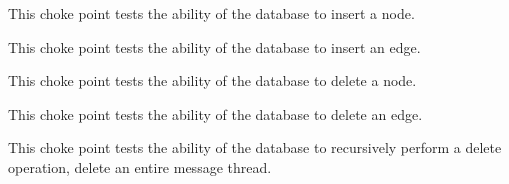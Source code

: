 
This choke point tests the ability of the database to insert a node.





This choke point tests the ability of the database to insert an edge.





This choke point tests the ability of the database to delete a node.





This choke point tests the ability of the database to delete an edge.





This choke point tests the ability of the database to recursively perform a delete operation, \eg delete an entire message thread.


